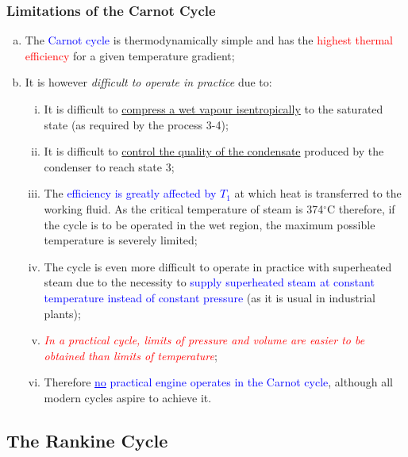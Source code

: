 \documentclass[10pt,compress,handout,ignorenonframetext]{beamer}
\newcommand{\red}{\textcolor{red}}
\newcommand{\blue}{\textcolor{blue}}
\begin{document}
\begin{frame}
 \frametitle{Limitations of the Carnot Cycle}
 \begin{enumerate}[(a)]
  \item <1-> The \blue{Carnot cycle} is thermodynamically simple and has the \red{highest thermal efficiency} for a given temperature gradient;
  \item <2-> It is however {\it difficult to operate in practice} due to:
  \begin{enumerate}[(i)] %
   \item <3-> It is difficult to \underline{compress a wet vapour isentropically} to the saturated state (as required by the process 3-4);
   \item <4-> It is difficult to \underline{control the quality of the condensate} produced by the condenser to reach state 3;
   \item <5-> The \blue{efficiency is greatly affected by $T_{1}$} at which heat is transferred to the working fluid. As the critical temperature of steam is 374$^{\circ}$C therefore, if the cycle is to be operated in the wet region, the maximum possible temperature is severely limited;
   \item <6-> The cycle is even more difficult to operate in practice with superheated steam due to the necessity to \blue{supply superheated steam at constant temperature instead of constant pressure} (as it is usual in industrial plants);
   \item <7-> \red{\it In a practical cycle, limits of pressure and volume are easier to be obtained than limits of temperature}; 
   \item <8-> Therefore \blue{\underline{no} practical engine operates in the Carnot cycle}, although all modern cycles aspire to achieve it.
  \end{enumerate}
 \end{enumerate}
 \normalsize
\end{frame}


\subsection{The Rankine Cycle}
\end{document}
